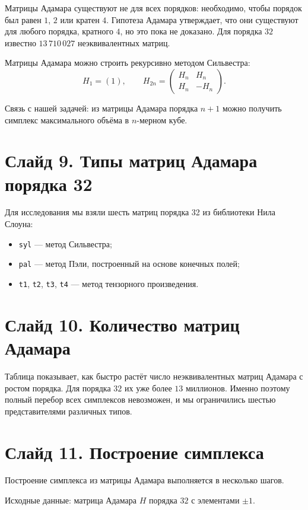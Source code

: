 \documentclass[a4paper,12pt]{article}
\begin{document}
Матрицы Адамара существуют не для всех порядков: необходимо, чтобы порядок был равен $1$, $2$ или кратен $4$. Гипотеза Адамара утверждает, что они существуют для любого порядка, кратного $4$, но это пока не доказано. Для порядка $32$ известно $13\,710\,027$ неэквивалентных матриц.

Матрицы Адамара можно строить рекурсивно методом Сильвестра:
\[
H_{1} = (1), \qquad H_{2n} = \begin{pmatrix} H_n & H_n \\ H_n & -H_n \end{pmatrix}.
\]

Связь с нашей задачей: из матрицы Адамара порядка $n+1$ можно получить симплекс максимального объёма в $n$-мерном кубе.

\section*{Слайд 9. Типы матриц Адамара порядка 32}

Для исследования мы взяли шесть матриц порядка 32 из библиотеки Нила Слоуна:
\begin{itemize}
    \item \texttt{syl} — метод Сильвестра;
    \item \texttt{pal} — метод Пэли, построенный на основе конечных полей;
    \item \texttt{t1}, \texttt{t2}, \texttt{t3}, \texttt{t4} — метод тензорного произведения.
\end{itemize}

\section*{Слайд 10. Количество матриц Адамара}

Таблица показывает, как быстро растёт число неэквивалентных матриц Адамара с ростом порядка. Для порядка $32$ их уже более $13$ миллионов. Именно поэтому полный перебор всех симплексов невозможен, и мы ограничились шестью представителями различных типов.

\section*{Слайд 11. Построение симплекса}

Построение симплекса из матрицы Адамара выполняется в несколько шагов.

Исходные данные: матрица Адамара $H$ порядка $32$ с элементами $\pm 1$.
\end{document}
